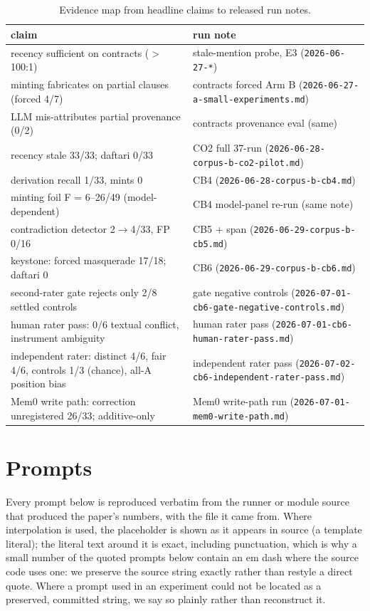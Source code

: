 \documentclass[11pt]{article}
\begin{document}
\begin{table}[h]
\centering
\footnotesize
\begin{tabular}{p{6.2cm}p{7.6cm}}
\toprule
claim & run note \\
\midrule
recency sufficient on contracts ($>$100:1) & stale-mention probe, E3 (\texttt{2026-06-27-*}) \\
minting fabricates on partial clauses (forced 4/7) & contracts forced Arm B (\texttt{2026-06-27-a-small-experiments.md}) \\
LLM mis-attributes partial provenance (0/2) & contracts provenance eval (same) \\
recency stale 33/33; daftari 0/33 & CO2 full 37-run (\texttt{2026-06-28-corpus-b-\allowbreak co2-pilot.md}) \\
derivation recall 1/33, mints 0 & CB4 (\texttt{2026-06-28-corpus-b-cb4.md}) \\
minting foil F = 6--26/49 (model-dependent) & CB4 model-panel re-run (same note) \\
contradiction detector 2$\to$4/33, FP 0/16 & CB5 + span (\texttt{2026-06-29-corpus-b-cb5.md}) \\
keystone: forced masquerade 17/18; daftari 0 & CB6 (\texttt{2026-06-29-corpus-b-cb6.md}) \\
second-rater gate rejects only 2/8 settled controls & gate negative controls (\texttt{2026-07-01-\allowbreak cb6-gate-\allowbreak negative-controls.md}) \\
human rater pass: 0/6 textual conflict, instrument ambiguity & human rater pass (\texttt{2026-07-01-\allowbreak cb6-human-\allowbreak rater-pass.md}) \\
independent rater: distinct 4/6, fair 4/6, controls 1/3 (chance), all-A position bias & independent rater pass (\texttt{2026-07-02-cb6-\allowbreak independent-rater-pass.md}) \\
Mem0 write path: correction unregistered 26/33; additive-only & Mem0 write-path run (\texttt{2026-07-01-mem0-write-path.md}) \\
\bottomrule
\end{tabular}
\caption{Evidence map from headline claims to released run notes.}
\label{tab:evidence}
\end{table}

\section{Prompts}
\label{app:prompts}

Every prompt below is reproduced verbatim from the runner or module source that produced
the paper's numbers, with the file it came from. Where interpolation is used, the
placeholder is shown as it appears in source (a template literal); the literal text around
it is exact, including punctuation, which is why a small number of the quoted prompts below
contain an em dash where the source code uses one: we preserve the source string exactly
rather than restyle a direct quote. Where a prompt used in an experiment could not be
located as a preserved, committed string, we say so plainly rather than reconstruct it.
\end{document}
